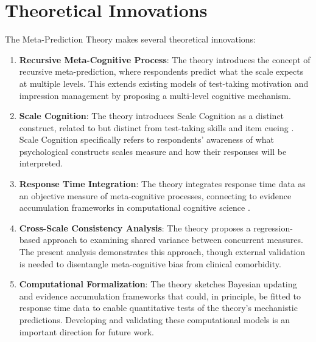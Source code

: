 \documentclass[10pt,twocolumn]{article}
\begin{document}

\section{Theoretical Innovations}

The Meta-Prediction Theory makes several theoretical innovations:

\begin{enumerate}
    \item \textbf{Recursive Meta-Cognitive Process}: The theory introduces the concept of recursive meta-prediction, where respondents predict what the scale expects at multiple levels. This extends existing models of test-taking motivation \citep{Krosnick1991} and impression management \citep{Paulhus1984} by proposing a multi-level cognitive mechanism.
    \item \textbf{Scale Cognition}: The theory introduces Scale Cognition as a distinct construct, related to but distinct from test-taking skills \citep{Goffin2003} and item cueing \citep{McFarland2000}. Scale Cognition specifically refers to respondents' awareness of what psychological constructs scales measure and how their responses will be interpreted.
    \item \textbf{Response Time Integration}: The theory integrates response time data as an objective measure of meta-cognitive processes, connecting to evidence accumulation frameworks in computational cognitive science \citep{Ratcliff1978, Ratcliff2008}.
    \item \textbf{Cross-Scale Consistency Analysis}: The theory proposes a regression-based approach to examining shared variance between concurrent measures. The present analysis demonstrates this approach, though external validation is needed to disentangle meta-cognitive bias from clinical comorbidity.
    \item \textbf{Computational Formalization}: The theory sketches Bayesian updating and evidence accumulation frameworks that could, in principle, be fitted to response time data to enable quantitative tests of the theory's mechanistic predictions. Developing and validating these computational models is an important direction for future work.
\end{enumerate}

\end{document}
